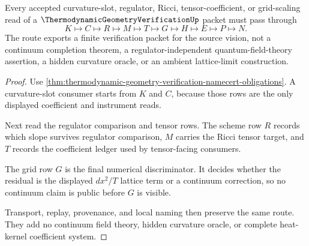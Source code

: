\begin{theorem}
\label{thm:thermodynamic-geometry-verification-curvature-slot-route}
Every accepted curvature-slot, regulator, Ricci, tensor-coefficient, or grid-scaling read of a $\ThermodynamicGeometryVerificationUp$ packet must pass through
$$
K \longmapsto C \longmapsto R \longmapsto M \longmapsto T \longmapsto G \longmapsto H \longmapsto E \longmapsto P \longmapsto N .
$$
The route exports a finite verification packet for the source vision, not a continuum completion theorem, a regulator-independent quantum-field-theory assertion, a hidden curvature oracle, or an ambient lattice-limit construction.
\end{theorem}
\begin{proof}
Use \autoref{thm:thermodynamic-geometry-verification-namecert-obligations}. A curvature-slot consumer starts from $K$ and $C$, because those rows are the only displayed coefficient and instrument reads.

Next read the regulator comparison and tensor rows. The scheme row $R$ records which slope survives regulator comparison, $M$ carries the Ricci tensor target, and $T$ records the coefficient ledger used by tensor-facing consumers.

The grid row $G$ is the final numerical discriminator. It decides whether the residual is the displayed $dx^2/T$ lattice term or a continuum correction, so no continuum claim is public before $G$ is visible.

Transport, replay, provenance, and local naming then preserve the same route. They add no continuum field theory, hidden curvature oracle, or complete heat-kernel coefficient system.
\end{proof}



